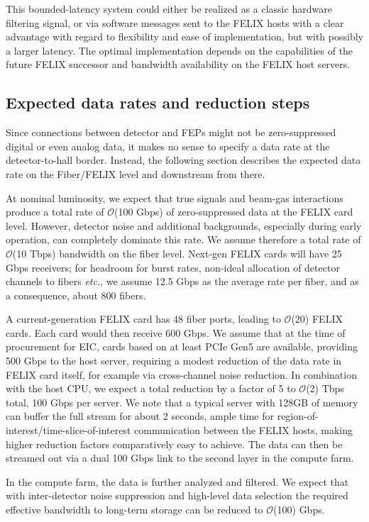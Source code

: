 This bounded-latency system could either be realized as a classic hardware filtering signal, or via software messages sent to the FELIX hosts with a clear advantage with regard to flexibility and ease of implementation, but with possibly a larger latency. The optimal implementation depends on the capabilities of the future FELIX successor and bandwidth availability on the FELIX host servers.



\subsection{Expected data rates and reduction steps}


Since connections between detector and FEPs might not be zero-suppressed digital or even analog data, it makes no sense to specify a data rate at the detector-to-hall border. Instead, the following section describes the expected data rate on the Fiber/FELIX level and downstream from there.

At nominal luminosity, we expect that true signals and beam-gas interactions produce a total rate of $\mathcal{O}$(100 Gbps) of zero-suppressed data at the FELIX card level. However, detector noise and additional backgrounds, especially during early operation, can completely dominate this rate. We assume therefore a total rate of $\mathcal{O}$(10 Tbps) bandwidth on the fiber level. Next-gen FELIX cards will have 25 Gbps receivers; for headroom for burst rates, non-ideal allocation of detector channels to fibers \emph{etc.}, we assume 12.5 Gbps as the average rate per fiber, and as a consequence, about 800 fibers.

A current-generation FELIX card has 48 fiber ports, leading to $\mathcal{O}$(20) FELIX cards. Each card would then receive 600 Gbps. We assume that at the time of procurement for EIC, cards based on at least PCIe Gen5 are available, providing 500 Gbps to the host server, requiring a modest reduction of the data rate in FELIX card itself, for example via cross-channel noise reduction. In combination with the host CPU, we expect a total reduction by a factor of 5 to $\mathcal{O}$(2) Tbps total, 100 Gbps per server. We note that a typical server with 128GB of memory can buffer the full stream for about 2 seconds, ample time for region-of-interest/time-slice-of-interest communication between the FELIX hosts, making higher reduction factors comparatively easy to achieve. The data can then be streamed out via a dual 100 Gbps link to the second layer in the compute farm.

In the compute farm, the data is further analyzed and filtered. We expect that with inter-detector noise suppression and high-level data selection the required effective bandwidth to long-term storage can be reduced to $\mathcal{O}$(100) Gbps.  







